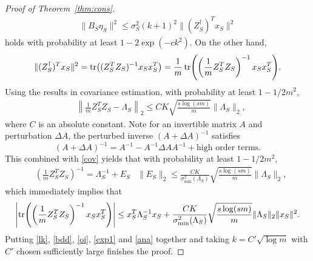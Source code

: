\documentclass[11pt,a4paper]{amsart}
\numberwithin{equation}{section}
\theoremstyle{plain}
\theoremstyle{definition}
\begin{document}
\begin{proof}[Proof of Theorem~\ref{thm:cons}]
\begin{align}
\|B_S\eta_S\|^2\leq \sigma^2_S(k+1)^2\|(Z_S^\dagger)^T x_S\|^2\label{oi}
\end{align}
holds with probability at least $1-2\exp(-ck^2)$. 
On the other hand, 
\begin{align}
\|(Z_S^\dagger)^T x_S\|^2 = \tr((Z_S^TZ_S)^{-1} x_Sx_S^T) = \frac{1}{m}\tr(\left(\frac{1}{m}Z_S^TZ_S\right)^{-1} x_Sx_S^T).\label{bdd}
\end{align}
Using the results in covariance estimation, with probability at least $1-1/2m^2$,
\begin{align}
&\left\|\frac{1}{m}Z_S^TZ_S -\Lambda_S\right\|_2\leq CK\sqrt{\frac{s\log (sm)}{m}}\|\Lambda_S\|_2,\label{cov}
\end{align}
where $C$ is an absolute constant. 
Note for an invertible matrix $A$ and perturbation $\Delta A$, the perturbed inverse $(A+\Delta A)^{-1}$ satisfies
$$(A+\Delta A)^{-1} =  A^{-1}-A^{-1}\Delta AA^{-1} + \text{high order terms}.$$ 
This combined with \eqref{cov} yields that with probability at least $1-1/2m^{2}$,
\begin{align}
&\left(\frac{1}{m}Z_S^TZ_S\right)^{-1} = \Lambda_S^{-1} + E_S& \|E_S\|_2\leq \frac{CK}{\sigma^2_{\min}(\Lambda_S)}\sqrt{\frac{s\log (sm)}{m}}\|\Lambda_S\|_2,
\end{align}
which immediately implies that
\begin{align}
\left|\tr(\left(\frac{1}{m}Z_S^TZ_S\right)^{-1} x_Sx_S^T)\right|\leq x_S^T\Lambda_S^{-1}x_S +\frac{CK}{\sigma^2_{\min}(\Lambda_S)}\sqrt{\frac{s\log (sm)}{m}}\|\Lambda_S\|_2\|x_S\|^2. \label{lk}
\end{align}
Putting \eqref{lk}, \eqref{bdd}, \eqref{oi}, \eqref{exp1} and \eqref{ana} together and taking $k=C'\sqrt{\log m}$ with $C'$ chosen sufficiently large finishes the proof. 
\end{proof}
\end{document}

